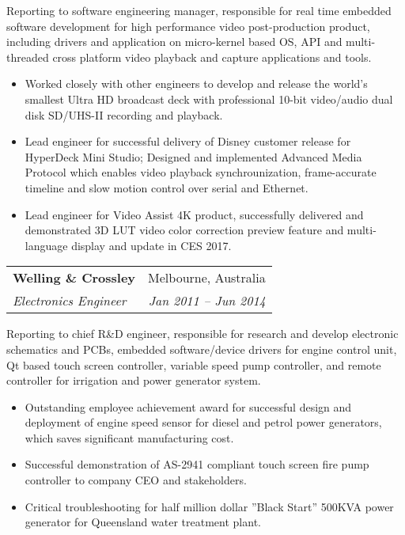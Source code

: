 \documentclass[letterpaper,11pt]{article}
\makeatletter
\newcommand{\resumeItemNoBullet}[4]{
  \vspace{-1pt}
    \begin{tabular*}{0.97\textwidth}{l@{\extracolsep{\fill}}r}
      \textbf{#1} & #2 \\
      \textit{\small#3} & \textit{\small #4} \\
    \end{tabular*}\vspace{-7pt}
}
\newcommand{\resumeSubHeadingListStart}{\begin{itemize}[leftmargin=*]}
\newcommand{\resumeSubHeadingListEnd}{\end{itemize}}
\makeatother
\begin{document}
\vspace{10pt}
{Reporting to software engineering manager, responsible for real time embedded software development for high performance video post-production product, including drivers and application on micro-kernel based OS, API and multi-threaded cross platform video playback and capture applications and tools.}
  \resumeSubHeadingListStart
    \item Worked closely with other engineers to develop and release the world’s smallest Ultra HD broadcast deck with professional 10-bit video/audio dual disk SD/UHS-II recording and playback. 
    \item Lead engineer for successful delivery of Disney customer release for HyperDeck Mini Studio; Designed and implemented Advanced Media Protocol which enables video playback synchrounization, frame-accurate timeline and slow motion control over serial and Ethernet.
    \item Lead engineer for Video Assist 4K product, successfully delivered and demonstrated 3D LUT video color correction preview feature and multi-language display and update in CES 2017.
  \resumeSubHeadingListEnd

\resumeItemNoBullet
{Welling \& Crossley}{Melbourne, Australia}
{Electronics Engineer}{Jan 2011 -- Jun 2014}

\vspace{10pt}
{ Reporting to chief R\&D engineer, responsible for research and develop electronic schematics and PCBs, embedded software/device drivers for engine control unit, Qt based touch screen controller, variable speed pump controller, and remote controller for irrigation and power generator system. }
  \resumeSubHeadingListStart
    \item Outstanding employee achievement award for successful design and deployment of engine speed sensor for diesel and petrol power generators, which saves significant manufacturing cost.
    \item Successful demonstration of AS-2941 compliant touch screen fire pump controller to company CEO and stakeholders. 
    \item Critical troubleshooting for half million dollar ”Black Start” 500KVA power generator for Queensland water treatment plant. 
  \resumeSubHeadingListEnd

\end{document}
